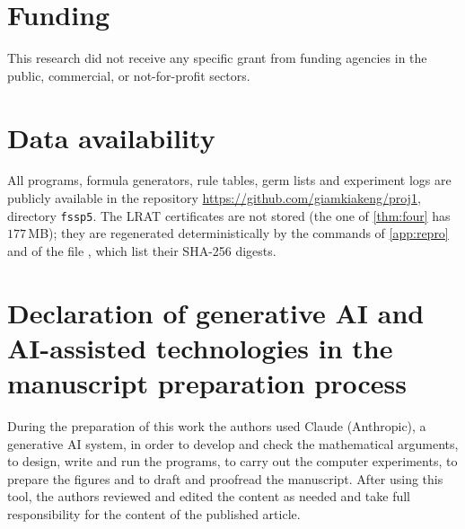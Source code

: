 \documentclass[preprint,11pt]{elsarticle}
\theoremstyle{definition}
\theoremstyle{remark}
\begin{document}
\section*{Funding}
This research did not receive any specific grant from funding agencies in
the public, commercial, or not-for-profit sectors.

\section*{Data availability}
All programs, formula generators, rule tables, germ lists and experiment
logs are publicly available in the repository
\url{https://github.com/giamkiakeng/proj1}, directory \texttt{fssp5}. The
LRAT certificates are not stored (the one of \cref{thm:four} has
$177$\,MB); they are regenerated deterministically by the commands of
\ref{app:repro} and of the file ,
which list their SHA-256 digests.

\section*{Declaration of generative AI and AI-assisted technologies in the
manuscript preparation process}
During the preparation of this work the authors used Claude (Anthropic), a
generative AI system, in order to develop and check the mathematical
arguments, to design, write and run the programs, to carry out the computer
experiments, to prepare the figures and to draft and proofread the
manuscript. After using this tool, the authors reviewed and edited the
content as needed and take full responsibility for the content of the
published article.





\end{document}
